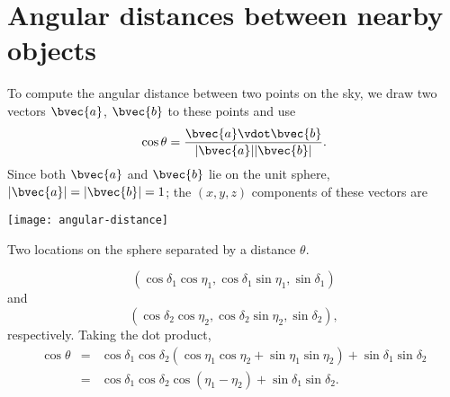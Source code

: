\section{Angular distances between nearby objects}

To compute the angular distance between two points on the sky, we draw two vectors $\bvec{a}$, $\bvec{b}$ to these points and use
\[ \cos\theta = \frac{\bvec{a}\vdot\bvec{b}}{|\bvec{a}||\bvec{b}|}. \]
Since both $\bvec{a}$ and $\bvec{b}$ lie on the unit sphere, $|\bvec{a}| = |\bvec{b}| = 1$; the $(x,y,z)$ components of these vectors are
\begin{marginfigure}[-14\baselineskip]
\texttt{[image: angular-distance]}
\caption[Angular distance between two points on a sphere]{Two locations on the sphere separated by a distance $\theta$.}
\label{f.angular-distance}
\end{marginfigure}
\[
\left(\cos\delta_{1}\cos\eta_{1}, \cos\delta_{1}\sin\eta_{1}, \sin\delta_{1}\right)
\]
and
\[
\left(\cos\delta_{2}\cos\eta_{2}, \cos\delta_{2}\sin\eta_{2}, \sin\delta_{2}\right),
\]
respectively. 
Taking the dot product,
\begin{eqnarray}
\cos\theta &=& \cos\delta_{1}\cos\delta_{2}\left(\cos\eta_{1}\cos\eta_{2} + 
	\sin\eta_{1}\sin\eta_{2}\right) + \sin\delta_{1}\sin\delta_{2}\nonumber\\
	 &=& \cos\delta_{1}\cos\delta_{2}\cos\left(\eta_{1}-\eta_{2}\right) + 
	 	\sin\delta_{1}\sin\delta_{2}.
\label{e.angular-distance}
\end{eqnarray}

